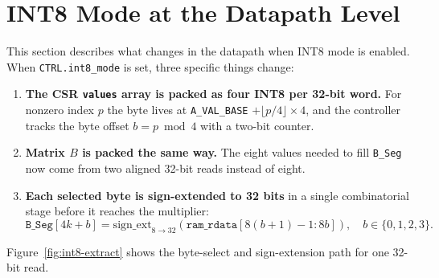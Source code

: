 \section{INT8 Mode at the Datapath Level}
\label{sec:int8}

This section describes what changes in the datapath when INT8 mode is
enabled. When \texttt{CTRL.int8\_mode} is set, three specific things
change:

\begin{enumerate}
  \item \textbf{The CSR \texttt{values} array is packed as four INT8 per
        32-bit word.} For nonzero index $p$ the byte lives at
        \texttt{A\_VAL\_BASE} $+ \lfloor p/4 \rfloor \times 4$, and the
        controller tracks the byte offset $b = p \bmod 4$ with a two-bit
        counter.
  \item \textbf{Matrix $B$ is packed the same way.} The eight values needed
        to fill \texttt{B\_Seg} now come from two aligned 32-bit reads
        instead of eight.
  \item \textbf{Each selected byte is sign-extended to 32 bits} in a single
        combinatorial stage before it reaches the multiplier:
        \begin{equation}
          \texttt{B\_Seg}[4k + b] = \mathrm{sign\_ext}_{8 \to 32}
          \!\left( \texttt{ram\_rdata}[8(b{+}1){-}1 : 8b] \right),
          \quad b \in \{0, 1, 2, 3\}.
          \label{eq:byte-extract}
        \end{equation}
\end{enumerate}

Figure~\ref{fig:int8-extract} shows the byte-select and sign-extension path
for one 32-bit read.

